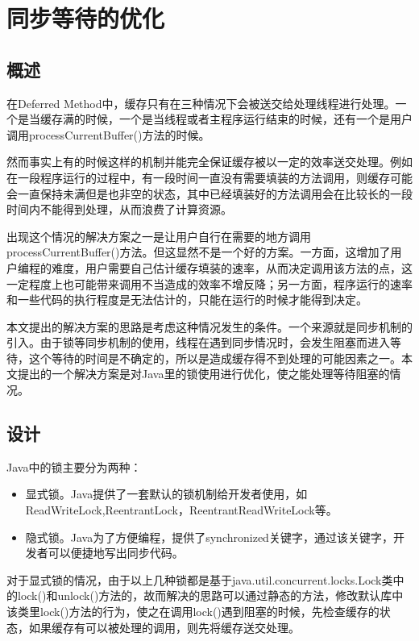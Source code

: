 \section{同步等待的优化}

\subsection{概述}

在Deferred Method中，缓存只有在三种情况下会被送交给处理线程进行处理。一个是当缓存满的时候，一个是当线程或者主程序运行结束的时候，还有一个是用户调用processCurrentBuffer()方法的时候。

然而事实上有的时候这样的机制并能完全保证缓存被以一定的效率送交处理。例如在一段程序运行的过程中，有一段时间一直没有需要填装的方法调用，则缓存可能会一直保持未满但是也非空的状态，其中已经填装好的方法调用会在比较长的一段时间内不能得到处理，从而浪费了计算资源。

出现这个情况的解决方案之一是让用户自行在需要的地方调用processCurrentBuffer()方法。但这显然不是一个好的方案。一方面，这增加了用户编程的难度，用户需要自己估计缓存填装的速率，从而决定调用该方法的点，这一定程度上也可能带来调用不当造成的效率不增反降；另一方面，程序运行的速率和一些代码的执行程度是无法估计的，只能在运行的时候才能得到决定。

本文提出的解决方案的思路是考虑这种情况发生的条件。一个来源就是同步机制的引入。由于锁等同步机制的使用，线程在遇到同步情况时，会发生阻塞而进入等待，这个等待的时间是不确定的，所以是造成缓存得不到处理的可能因素之一。本文提出的一个解决方案是对Java里的锁使用进行优化，使之能处理等待阻塞的情况。

\subsection{设计}

Java中的锁主要分为两种：

\begin{itemize}
	\item 显式锁。Java提供了一套默认的锁机制给开发者使用，如ReadWriteLock,ReentrantLock，ReentrantReadWriteLock等。
	\item 隐式锁。Java为了方便编程，提供了synchronized关键字，通过该关键字，开发者可以便捷地写出同步代码。
\end{itemize}

对于显式锁的情况，由于以上几种锁都是基于java.util.concurrent.locks.Lock类中的lock()和unlock()方法的，故而解决的思路可以通过静态的方法，修改默认库中该类里lock()方法的行为，使之在调用lock()遇到阻塞的时候，先检查缓存的状态，如果缓存有可以被处理的调用，则先将缓存送交处理。

